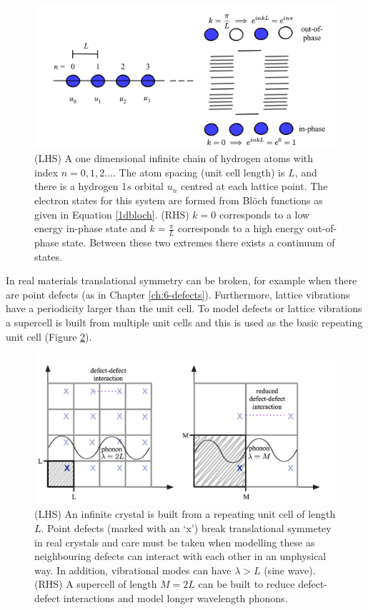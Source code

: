 \begin{figure}[h]
\centering
  \includegraphics[width=1.0\columnwidth]{figures/ch3/bands.png}
  \caption[In-phase and out-of-phase states in an infinite 1D crystal]{(LHS) A one dimensional infinite chain of hydrogen atoms with index $n=0,1,2\ldots$. The atom spacing (unit cell length) is $L$, and there is a hydrogen 1$s$ orbital $u_n$ centred at each lattice point. The electron states for this system are formed from Bl\"{o}ch functions as given in Equation \ref{1dbloch}. (RHS) $k=0$ corresponds to a low energy in-phase state and $k=\frac{\pi}{L}$ corresponds to a high energy out-of-phase state. Between these two extremes there exists a continuum of states.} 
  \label{bands}
\end{figure}

In real materials translational symmetry can be broken, for example when there are point defects (as in Chapter \ref{ch:6-defects}). Furthermore, lattice vibrations have a periodicity larger than the unit cell. To model defects or lattice vibrations a supercell is built from multiple unit cells and this is used as the basic repeating unit cell (Figure \ref{translational}).

\begin{figure}[h]
\centering
  \includegraphics[width=0.8\columnwidth]{figures/ch3/supercell.png}
  \caption[Translational symmetry and supercell construction]{(LHS) An infinite crystal is built from a repeating unit cell of length $L$. Point defects (marked with an `x') break translational symmetey in real crystals and care must be taken when modelling these as neighbouring defects can interact with each other in an unphysical way. In addition, vibrational modes can have $\lambda>L$ (sine wave). (RHS) A supercell of length $M=2L$ can be built to reduce defect-defect interactions and model longer wavelength phonons. } 
  \label{translational}
\end{figure}

